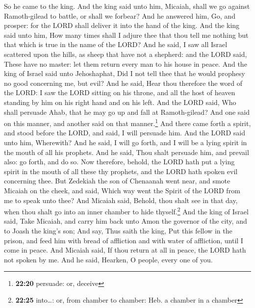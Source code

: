 So he came to the king. And the king said unto him,
Micaiah, shall we go against Ramoth-gilead to battle, or shall we
forbear? And he answered him, Go, and prosper: for the LORD shall
deliver it into the hand of the king.  And the king said
unto him, How many times shall I adjure thee that thou tell me nothing
but that which is true in the name of the LORD?  And he
said, I saw all Israel scattered upon the hills, as sheep that have not
a shepherd: and the LORD said, These have no master: let them return
every man to his house in peace.  And the king of Israel
said unto Jehoshaphat, Did I not tell thee that he would prophesy no
good concerning me, but evil?  And he said, Hear thou
therefore the word of the LORD: I saw the LORD sitting on his throne,
and all the host of heaven standing by him on his right hand and on his
left.  And the LORD said, Who shall persuade Ahab, that
he may go up and fall at Ramoth-gilead? And one said on this manner, and
another said on that manner.\footnote{\textbf{22:20} persuade: or,
  deceive}  And there came forth a spirit, and stood
before the LORD, and said, I will persuade him.  And the
LORD said unto him, Wherewith? And he said, I will go forth, and I will
be a lying spirit in the mouth of all his prophets. And he said, Thou
shalt persuade him, and prevail also: go forth, and do so.
 Now therefore, behold, the LORD hath put a lying spirit
in the mouth of all these thy prophets, and the LORD hath spoken evil
concerning thee.  But Zedekiah the son of Chenaanah went
near, and smote Micaiah on the cheek, and said, Which way went the
Spirit of the LORD from me to speak unto thee?  And
Micaiah said, Behold, thou shalt see in that day, when thou shalt go
into an inner chamber to hide thyself.\footnote{\textbf{22:25}
  into\ldots: or, from chamber to chamber: Heb. a chamber in a chamber}
 And the king of Israel said, Take Micaiah, and carry him
back unto Amon the governor of the city, and to Joash the king's son;
 And say, Thus saith the king, Put this fellow in the
prison, and feed him with bread of affliction and with water of
affliction, until I come in peace.  And Micaiah said, If
thou return at all in peace, the LORD hath not spoken by me. And he
said, Hearken, O people, every one of you.

